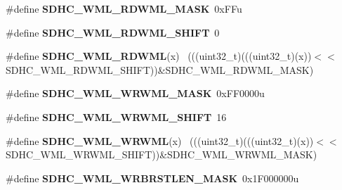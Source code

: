 \begin{DoxyCompactItemize}
\item 
\hypertarget{group___s_d_h_c___register___masks_gae6b31e76805f36f9903c70818642decc}{}\#define {\bfseries S\+D\+H\+C\+\_\+\+W\+M\+L\+\_\+\+R\+D\+W\+M\+L\+\_\+\+M\+A\+S\+K}~0x\+F\+Fu\label{group___s_d_h_c___register___masks_gae6b31e76805f36f9903c70818642decc}

\item 
\hypertarget{group___s_d_h_c___register___masks_gaccbe2485e8ba11877a5d0c45efef3cf5}{}\#define {\bfseries S\+D\+H\+C\+\_\+\+W\+M\+L\+\_\+\+R\+D\+W\+M\+L\+\_\+\+S\+H\+I\+F\+T}~0\label{group___s_d_h_c___register___masks_gaccbe2485e8ba11877a5d0c45efef3cf5}

\item 
\hypertarget{group___s_d_h_c___register___masks_gad6fd0c9782918c250a571fd84874d80e}{}\#define {\bfseries S\+D\+H\+C\+\_\+\+W\+M\+L\+\_\+\+R\+D\+W\+M\+L}(x)                                            ~(((uint32\+\_\+t)(((uint32\+\_\+t)(x))$<$$<$S\+D\+H\+C\+\_\+\+W\+M\+L\+\_\+\+R\+D\+W\+M\+L\+\_\+\+S\+H\+I\+F\+T))\&S\+D\+H\+C\+\_\+\+W\+M\+L\+\_\+\+R\+D\+W\+M\+L\+\_\+\+M\+A\+S\+K)\label{group___s_d_h_c___register___masks_gad6fd0c9782918c250a571fd84874d80e}

\item 
\hypertarget{group___s_d_h_c___register___masks_gabfe9926c62d373c8d28b1bcc7ba0010f}{}\#define {\bfseries S\+D\+H\+C\+\_\+\+W\+M\+L\+\_\+\+W\+R\+W\+M\+L\+\_\+\+M\+A\+S\+K}~0x\+F\+F0000u\label{group___s_d_h_c___register___masks_gabfe9926c62d373c8d28b1bcc7ba0010f}

\item 
\hypertarget{group___s_d_h_c___register___masks_ga026a7e92688832bffea0905554f30253}{}\#define {\bfseries S\+D\+H\+C\+\_\+\+W\+M\+L\+\_\+\+W\+R\+W\+M\+L\+\_\+\+S\+H\+I\+F\+T}~16\label{group___s_d_h_c___register___masks_ga026a7e92688832bffea0905554f30253}

\item 
\hypertarget{group___s_d_h_c___register___masks_gacd645e9061dda369caa06214d404e980}{}\#define {\bfseries S\+D\+H\+C\+\_\+\+W\+M\+L\+\_\+\+W\+R\+W\+M\+L}(x)                                            ~(((uint32\+\_\+t)(((uint32\+\_\+t)(x))$<$$<$S\+D\+H\+C\+\_\+\+W\+M\+L\+\_\+\+W\+R\+W\+M\+L\+\_\+\+S\+H\+I\+F\+T))\&S\+D\+H\+C\+\_\+\+W\+M\+L\+\_\+\+W\+R\+W\+M\+L\+\_\+\+M\+A\+S\+K)\label{group___s_d_h_c___register___masks_gacd645e9061dda369caa06214d404e980}

\item 
\hypertarget{group___s_d_h_c___register___masks_ga8a1713e8f594e5db7e84383d1839016d}{}\#define {\bfseries S\+D\+H\+C\+\_\+\+W\+M\+L\+\_\+\+W\+R\+B\+R\+S\+T\+L\+E\+N\+\_\+\+M\+A\+S\+K}~0x1\+F000000u\label{group___s_d_h_c___register___masks_ga8a1713e8f594e5db7e84383d1839016d}


\end{DoxyCompactItemize}
